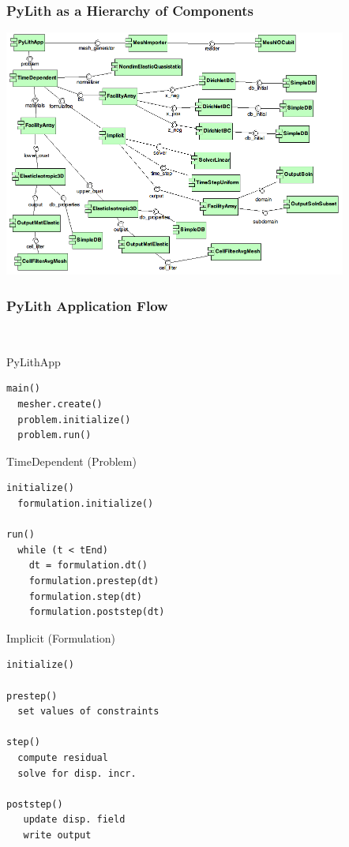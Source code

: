 \documentclass{beamer}
\begin{document}
\begin{frame}
  \frametitle{PyLith as a Hierarchy of Components}
  \includegraphics[height=3.2in]{figs/step01_components}
\end{frame}



\begin{frame}[fragile]
  \frametitle{PyLith Application Flow}
  \summary{}
 
{\small\tt
  \begin{minipage}[t]{2.0in}
      \begin{block}{PyLithApp}
        \begin{verbatim}
main()
  mesher.create()
  problem.initialize()
  problem.run()
\end{verbatim}
    \end{block}
    \begin{block}{TimeDependent (Problem)}
    \begin{verbatim}
initialize()
  formulation.initialize()

run()
  while (t < tEnd)
    dt = formulation.dt()
    formulation.prestep(dt)
    formulation.step(dt)
    formulation.poststep(dt)
\end{verbatim}
  \end{block}
\end{minipage}
  \hfill
  \begin{minipage}[t]{2.0in}
    \begin{block}{Implicit (Formulation)}
      \begin{verbatim}
initialize()

prestep()
  set values of constraints

step()
  compute residual
  solve for disp. incr.

poststep()
   update disp. field
   write output
\end{verbatim}
    \end{block}
  \end{minipage}
}

\end{frame}
\end{document}
